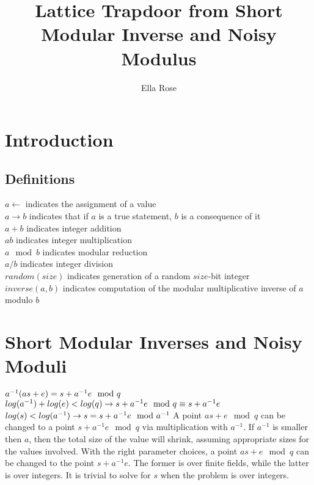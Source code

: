 \documentclass[preprint]{iacrtrans}
\author{Ella Rose}
\institute{Paso Robles, CA \email{python_pride@protonmail.com}}
\title[Lattice Trapdoor from Short Modular Inverse and Noisy Modulus]{Lattice Trapdoor from Short Modular Inverse and Noisy Modulus}
\begin{document}
\maketitle


\begin{abstract}

 \end{abstract}

\section{Introduction}

\subsection{Definitions}
$a \leftarrow$ indicates the assignment of a value\\
$a \rightarrow b$ indicates that if $a$ is a true statement, $b$ is a consequence of it\\
$a + b$ indicates integer addition\\
$a b$ indicates integer multiplication\\
$a \mod b$ indicates modular reduction\\
$a / b$ indicates integer division\\
$random(size)$ indicates generation of a random $size$-bit integer\\
$inverse(a, b)$ indicates computation of the modular multiplicative inverse of $a$ modulo $b$\\

\section{Short Modular Inverses and Noisy Moduli}
$a^{-1} (a s + e) = s + a^{-1} e \mod q\\ \\$
$log(a^{-1}) + log(e) < log(q) \rightarrow s + a^{-1} e \mod q \equiv s + a^{-1} e\\ \\$
$log(s) < log(a^{-1}) \rightarrow s = s + a^{-1} e \mod a^{-1}\\ \\$
A point $a s + e \mod q$  can be changed to a point $s + a^{-1} e \mod q$ via multiplication with $a^{-1}$. If $a^{-1}$ is smaller then $a$, then the total size of the value will shrink, assuming appropriate sizes for the values involved. With the right parameter choices, a point $a s + e \mod q$ can be changed to the point $s + a^{-1} e$. The former is over finite fields, while the latter is over integers. It is trivial to solve for $s$ when the problem is over integers.
\end{document}
